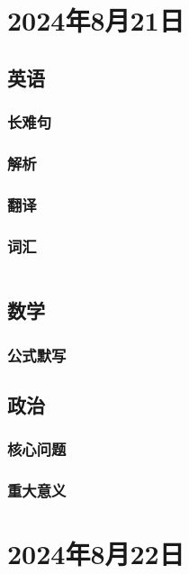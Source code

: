 \documentclass[UTF8]{ctexart}
\begin{document}
\section{2024年8月21日}
\subsection{英语}
\subsubsection{长难句}
\subsubsection{解析}
\subsubsection{翻译}
\subsubsection{词汇}\begin{table}[h]
      \centering
      \begin{tabular}{p{}p{}}
      \end{tabular}
\end{table}
\subsection{数学}
\subsubsection{公式默写}
\begin{multicols}{2}
\end{multicols}
\subsection{政治}
\subsubsection{}
\subsubsection{核心问题}
\subsubsection{重大意义}
\section{2024年8月22日}
\end{document}
